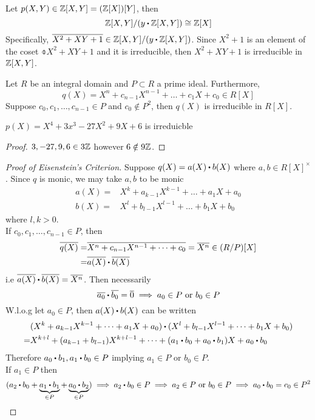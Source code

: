 \documentclass[../Main.tex]{subfiles}
\begin{document}
\begin{example}
	Let $p(X,Y)\in \mathbb{Z}[X,Y] = (\mathbb{Z}[X])[Y]$, then
	\[\Z[X,Y]/(y\rdot \Z[X,Y]) \cong \Z[X]\]
	Specifically, $\obar{X^2+XY+1} \in \Z[X,Y]/(y\rdot \Z[X,Y])$. Since $X^2+1$ is an element of the coset $\obar{X^2+XY+1}$ and it is irreducible, then $X^2+XY+1$ is irreducible in $\mathbb{Z}[X,Y]$.
\end{example}
\newpage
\begin{thm}[title= Eisenstein's Criterion,label=eisen]
	Let $R$ be an integral domain and $P\subset R$ a prime ideal. Furthermore,
	\[q(X)=X^n+c_{n-1}X^{n-1}+\dots+c_1X+c_0\in R[X]\]
	Suppose $c_0,c_1,\dots,c_{n-1}\in P$ and $c_0\notin P^2$, then $q(X)$ is irreducible in $R[X]$.
\end{thm}
\begin{claim}
	$p(X) =X^4+3x^3-27X^2+9X+6$ is irreduicble
\end{claim}
\begin{proof}
	$3,-27,9,6\in 3\mathbb{Z}$ however $6\notin 9\mathbb{Z}$.
\end{proof}
\begin{proof}[Proof of Eisenstein's Criterion]
	Suppose $q(X)=a(X)\rdot b(X)$ where $a,b\in R[X]^\times$. Since $q$ is monic, we may take $a,b$ to be monic
	\begin{align*}
	a(X)=&X^k+a_{k-1}X^{k-1}+\dots+a_1X+a_0\\
	b(X)=&X^l+b_{l-1}X^{l-1}+\dots+b_1X+b_0
	\end{align*}
	where $l,k>0$.\\
	If $c_0,c_1,\dots,c_{n-1}\in P$, then
	\begin{align*}
	\obar{q(X)}=&\obar{X^n+c_{n-1}X^{n-1}+\dots+c_0}=\obar{X^n} \in (R/P)[X] \\
	 =&\obar{a(X)}\rdot \obar{b(X)}
	\end{align*}
	i.e $\obar{a(X)}\rdot \obar{b(X)} = \obar{X^n}$. Then necessarily
	\[\obar{a_0}\rdot \obar{b_0}=\obar{0} \implies a_0 \in P \text{ or } b_0\in P\]
	W.l.o.g let $a_0\in P$, then $a(X)\rdot b(X)$ can be written
	\begin{align*}
	&(X^k+a_{k-1}X^{k-1}+\dots+a_1X+a_0)\rdot (X^l+b_{l-1}X^{l-1}+\dots+b_1X+b_0) \\
	=&X^{k+l}+(a_{k-1}+b_{l-1})X^{k+l-1}+\dots+(a_1\rdot b_0+a_0\rdot b_1)X+a_0\rdot b_0
	\end{align*}
	Therefore $a_0\rdot b_1,a_1\rdot b_0\in P$ implying $a_1\in P$ or $b_0\in P$.\\
	If $a_1\in P$ then
	\[(a_2\rdot b_0+\underbrace{a_1\rdot b_1}_{\in P} + \underbrace{a_0\rdot b_2}_{\in P}) \implies a_2\rdot b_0\in P \implies a_2\in P \text{ or } b_0\in P \implies a_0\rdot b_0=c_0\in P^2\]
\end{proof}
\end{document}
